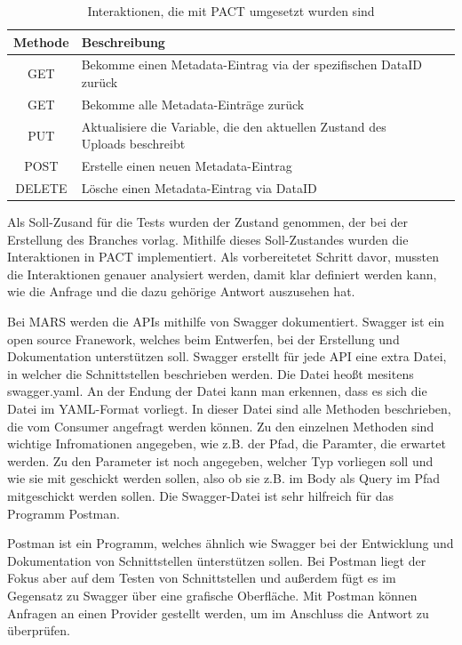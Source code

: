 \documentclass{llncs}
\begin{document}
\begin{table}[htbp]
\centering
\begin{tabular}{|c|l|p{4cm}|p{4cm}|}
\hline
\multicolumn{1}{|l|}{Methode} & Beschreibung \\ \hline
GET & Bekomme einen Metadata-Eintrag via der spezifischen DataID zurück\\ \hline
GET & Bekomme alle Metadata-Einträge zurück \\ \hline
PUT & Aktualisiere die Variable, die den aktuellen Zustand des Uploads beschreibt \\ \hline
POST & Erstelle einen neuen Metadata-Eintrag \\ \hline
DELETE & Lösche einen Metadata-Eintrag via DataID\\ \hline
\end{tabular}
\caption{Interaktionen, die mit PACT umgesetzt wurden sind}
\label{tab:Interaktionen_PACT}
\end{table}

Als Soll-Zusand für die Tests wurden der Zustand genommen, der bei der Erstellung des Branches vorlag. Mithilfe dieses Soll-Zustandes wurden die Interaktionen in PACT implementiert. Als vorbereitetet Schritt davor, mussten die Interaktionen genauer analysiert werden, damit klar definiert werden kann, wie die Anfrage und die dazu gehörige Antwort auszusehen hat.

Bei MARS werden die APIs mithilfe von Swagger\citep{swagger} dokumentiert. Swagger ist ein open source Franework, welches beim Entwerfen, bei der Erstellung und Dokumentation unterstützen soll. Swagger erstellt für jede API eine extra Datei, in welcher die Schnittstellen beschrieben werden. Die Datei heoßt mesitens swagger.yaml. An der Endung der Datei kann man erkennen, dass es sich die Datei im YAML-Format vorliegt. In dieser Datei sind alle Methoden beschrieben, die vom Consumer angefragt werden können. Zu den einzelnen Methoden sind wichtige Infromationen angegeben, wie z.B. der Pfad, die Paramter, die erwartet werden. Zu den Parameter ist noch angegeben, welcher Typ vorliegen soll und wie sie mit geschickt werden sollen, also ob sie z.B. im Body als Query im Pfad mitgeschickt werden sollen. Die Swagger-Datei ist sehr hilfreich für das Programm Postman.

Postman ist ein Programm, welches ähnlich wie Swagger bei der Entwicklung und Dokumentation von Schnittstellen ünterstützen sollen. Bei Postman liegt der Fokus aber auf dem Testen von Schnittstellen und außerdem fügt es im Gegensatz zu Swagger über eine grafische Oberfläche. Mit Postman können Anfragen an einen Provider gestellt werden, um im Anschluss die Antwort zu überprüfen. 
\end{document}

